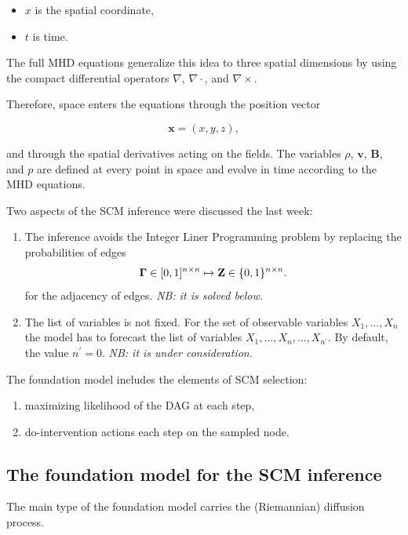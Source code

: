 \documentclass[12pt]{article}
\begin{document}
\begin{itemize}
\item $x$ is the spatial coordinate,
\item $t$ is time.
\end{itemize}

The full MHD equations generalize this idea to three spatial dimensions by using
the compact differential operators $\nabla$, $\nabla\cdot$, and $\nabla\times$.

Therefore, space enters the equations through the position vector

\[
\mathbf{x}=(x,y,z),
\]

and through the spatial derivatives acting on the fields.
The variables $\rho$, $\mathbf{v}$, $\mathbf{B}$, and $p$
are defined at every point in space and evolve in time according to the MHD equations.









Two aspects of the SCM inference were discussed the last week:
\begin{enumerate}
\item The inference avoids the  Integer Liner Programming problem by replacing the probabilities of edges
\[{\boldsymbol{\Gamma}} \in [0,1]^{n\times n} \mapsto \mathbf{Z} \in \{0,1\}^{n\times n}.\]
for the adjacency of edges. \emph{NB: it is solved below.}
\item  The list of variables is not fixed.
For the set of observable variables $X_1,\dots,X_n$
the model has to forecast the list of variables $X_1,\dots,X_n, \dots, X_{n^\prime}$.
By default, the value $n^\prime=0$. \emph{NB: it is under consideration.}
\end{enumerate}

The foundation model includes the elements of SCM selection:
\begin{enumerate}[1)]
\item maximizing likelihood of the DAG at each step,
\item do-intervention actions each step on the sampled node.
\end{enumerate}

\subsection*{The foundation model for the SCM inference}
The main type of the foundation model carries the (Riemannian) diffusion process.
\end{document}
